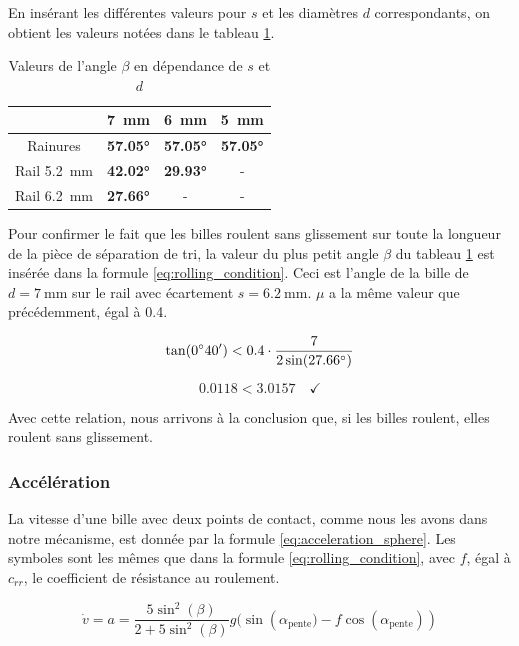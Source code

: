 En insérant les différentes valeurs pour $s$ et les diamètres $d$ correspondants, on obtient les valeurs notées dans le tableau \ref{tab:beta_sphere}.

\begin{table}[htbp]
    \centering
    \begin{tabular}{|c|c|c|c|}
        \hline
         & \SI{7}{\mm} & \SI{6}{\mm} & \SI{5}{\mm} \\
        \hline
        Rainures & \textbf{\ang{57.05}} & \textbf{\ang{57.05}} & \textbf{\ang{57.05}} \\
        \hline
        Rail \SI{5.2}{\mm}& \textbf{\ang{42.02}} & \textbf{\ang{29.93}} & - \\
        \hline
        Rail \SI{6.2}{\mm}& \textbf{\ang{27.66}} & - & - \\
        \hline
    \end{tabular}
    \caption{Valeurs de l'angle $\beta$ en dépendance de $s$ et $d$}
    \label{tab:beta_sphere}
\end{table}

Pour confirmer le fait que les billes roulent sans glissement sur toute la longueur de la pièce de séparation de tri, la valeur du plus petit angle $\beta$ du tableau \ref{tab:beta_sphere} est insérée dans la formule \ref{eq:rolling_condition}. Ceci est l'angle de la bille de $d = \SI{7}{\mm}$ sur le rail avec écartement $s = \SI{6.2}{\mm}$. $\mu$ a la même valeur que précédemment, égal à \num{0.4}.

\[\sisetup{add-arc-degree-zero} \tan(\ang{;40;}) < \num{0.4} \cdot \frac{7}{2\sin(\ang{27.66})}\]

\[\num{0.0118} < \num{3.0157} \quad \checkmark\]

Avec cette relation, nous arrivons à la conclusion que, si les billes roulent, elles roulent sans glissement.

\subsubsection{Accélération}
La vitesse d'une bille avec deux points de contact, comme nous les avons dans notre mécanisme, est donnée par la formule \ref{eq:acceleration_sphere}. Les symboles sont les mêmes que dans la formule \ref{eq:rolling_condition}, avec $f$, égal à $c_{rr}$, le coefficient de résistance au roulement.

\begin{equation}
    \dot{v} = a = \frac{5\sin^{2}(\beta)}{2+5\sin^{2}(\beta)} g(\sin({\alpha_{\text{pente}}) - f\cos(\alpha_{\text{pente}})})
    \label{eq:acceleration_sphere}
\end{equation}

